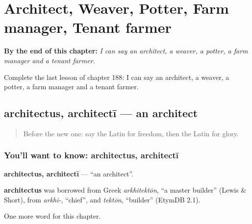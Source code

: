 
\chapter{Architect, Weaver, Potter, Farm manager, Tenant farmer}
\label{ch:la-architect-weaver-potter-farm-manager-tenant-farmer}

\begin{chapteropening}
\textbf{By the end of this chapter:} \emph{I can say an architect, a weaver, a potter, a farm manager and a tenant farmer.}

Complete the last lesson of chapter 188: I can say an architect, a weaver, a potter, a farm manager and a tenant farmer.
\end{chapteropening}

\section[architectus, architectī]{architectus, architectī — an architect}

\label{lesson:LA-C188-architectus}



\begin{quote}
Before the new one: say the Latin for freedom, then the Latin for glory.
\end{quote}

\subsection*{You'll want to know: architectus, architectī}
\textbf{architectus, architectī} — \textquotedblleft{}an architect\textquotedblright{}.

\begin{cousinweb}
\textbf{architectus} was borrowed from Greek \emph{arkhitektōn}, \textquotedblleft{}a master builder\textquotedblright{} (Lewis \& Short), from \emph{arkhi-}, \textquotedblleft{}chief\textquotedblright{}, and \emph{tektōn}, \textquotedblleft{}builder\textquotedblright{} (EtymDB 2.1).
\end{cousinweb}

\begin{grammarlens}[title={What you've built}]
One more word for this chapter.
\end{grammarlens}

